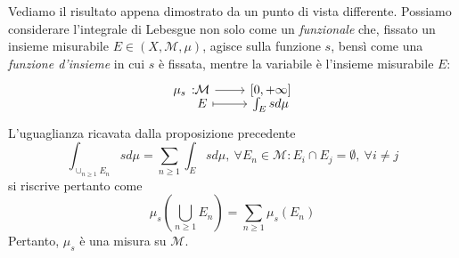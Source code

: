 Vediamo il risultato appena dimostrato da un punto di vista differente. Possiamo considerare l'integrale di Lebesgue non solo come un \textit{funzionale} che, fissato un insieme misurabile $E\in\left(X,\mathcal{M},\mu\right)$, agisce sulla funzione $s$, bensì come una \textit{funzione d'insieme} in cui $s$ è fissata, mentre la variabile è l'insieme misurabile $E$:
\begin{equation}
	\funztot{\mu_s}{\mathcal{M}}{\left[0,+\infty\right]}{E}{\int_Esd\mu}
\end{equation}
L'uguaglianza ricavata dalla proposizione precedente 
\begin{equation*}
	\int_{\cup_{n\geq 1}E_n}sd\mu=\sum_{n\geq 1}\int_{E}sd\mu,\ \forall E_n\in\mathcal{M}\colon E_i\cap E_j=\emptyset,\ \forall i\neq j
\end{equation*}
si riscrive pertanto come
\begin{equation*}
	\mu_s\left(\bigcup_{n\geq 1}E_n\right)=\sum_{n\geq 1}\mu_s\left(E_n\right)
\end{equation*}
Pertanto, $\mu_s$ è una misura su $\mathcal{M}$.
